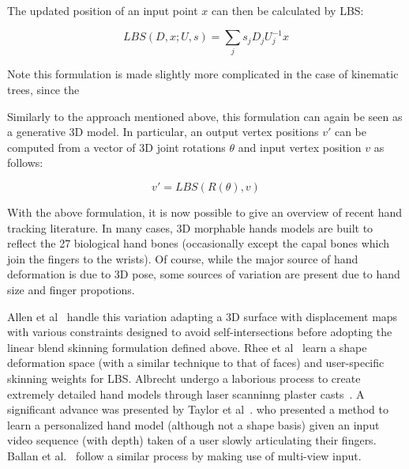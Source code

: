\begin{definition}
The updated position of an input point $x$ can then be calculated by LBS:

\begin{equation}
    LBS(D, x; U, s) = \sum_{j}s_{j}D_{j}U_{j}^{-1}x
\end{equation}

Note this formulation is made slightly more complicated in the case of kinematic trees, since the 

Similarly to the approach mentioned above, this formulation can again be seen as a generative 3D model. In particular, an output vertex positions $v'$ can be computed from a vector of 3D joint rotations $\theta$ and input vertex position $v$ as follows:

\begin{equation}
    v' = LBS(R(\theta), v)
\end{equation}

\end{definition}

With the above formulation, it is now possible to give an overview of recent hand tracking literature. In many cases, 3D morphable hands models are built to reflect the 27 biological hand bones (occasionally except the capal bones which join the fingers to the wrists). Of course, while the major source of hand deformation is due to 3D pose, some sources of variation are present due to hand size and finger propotions.

Allen et al~\cite{xxx} handle this variation adapting a 3D surface with displacement maps with various constraints designed to avoid self-intersections before adopting the linear blend skinning formulation defined above. Rhee et al~\cite{xxx} learn a shape deformation space (with a similar technique to that of faces) and user-specific skinning weights for LBS. Albrecht undergo a laborious process to create extremely detailed hand models through laser scanninng plaster casts~\cite{xxx}. A significant advance was presented by Taylor et al~\cite{xxx}. who presented a method to learn a personalized hand model (although not a shape basis) given an input video sequence (with depth) taken of a user slowly articulating their fingers. Ballan et al.~\cite{xxx} follow a similar process by making use of multi-view input. 



